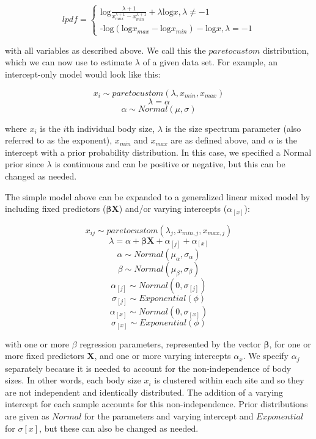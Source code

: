 \documentclass[
  12pt,
]{article}
\numberwithin{equation}
\begin{document}
\[
 lpdf = \begin{cases}\text{log}\frac{\lambda + 1}{{x_{max}^{\lambda+1}} - {x_{min}^{\lambda+1}}} + \lambda\text{log}x, \lambda \neq-1 \\
\text{-log}({{\text{log}x_{max}} - {\text{log}x_{min}}}) -\text{log}x, \lambda = -1\end{cases}
\]

with all variables as described above. We call this the \(paretocustom\)
distribution, which we can now use to estimate \(\lambda\) of a given
data set. For example, an intercept-only model would look like this:

\[x_i \sim paretocustom(\lambda, x_{min}, x_{max})\]
\[\lambda = \alpha\] \[\alpha \sim Normal(\mu, \sigma)\]

where \(x_i\) is the \(i\)th individual body size, \(\lambda\) is the
size spectrum parameter (also referred to as the exponent), \(x_{min}\)
and \(x_{max}\) are as defined above, and \(\alpha\) is the intercept
with a prior probability distribution. In this case, we specified a
Normal prior since \(\lambda\) is continuous and can be positive or
negative, but this can be changed as needed.

The simple model above can be expanded to a generalized linear mixed
model by including fixed predictors (\(\boldsymbol\beta \textbf{X}\))
and/or varying intercepts (\(\alpha_{[x]}\)):

\[x_{ij} \sim paretocustom(\lambda_j, x_{min, j}, x_{max, j})\]
\[\lambda = \alpha + \boldsymbol\beta \textbf{X} + \alpha_{[j]} + \alpha_{[x]}\]
\[\alpha \sim Normal(\mu_{\alpha}, \sigma_{\alpha})\]
\[\beta \sim Normal(\mu_{\beta},\sigma_{\beta})\]
\[\alpha_{[j]} \sim Normal(0, \sigma_{[j]})\]
\[\sigma_{[j]} \sim Exponential(\phi)\]
\[\alpha_{[x]} \sim Normal(0, \sigma_{[x]})\]
\[\sigma_{[x]} \sim Exponential(\phi)\]

with one or more \(\beta\) regression parameters, represented by the
vector \(\boldsymbol\beta\), for one or more fixed predictors
\(\textbf{X}\), and one or more varying intercepts \(\alpha_x\). We
specify \(\alpha_{j}\) separately because it is needed to account for
the non-independence of body sizes. In other words, each body size
\(x_i\) is clustered within each site and so they are not independent
and identically distributed. The addition of a varying intercept for
each sample accounts for this non-independence. Prior distributions are
given as \(Normal\) for the parameters and varying intercept and
\(Exponential\) for \(\sigma{[x]}\), but these can also be changed as
needed.
\end{document}
